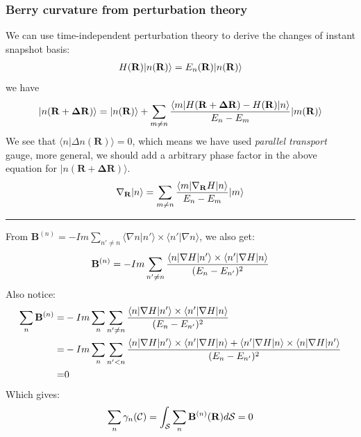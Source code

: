 \documentclass[letterpaper,10pt,english]{sphinxmanual}
\begin{document}
\subsubsection{Berry curvature from perturbation theory}
\label{TI/Lecture notes/2:berry-curvature-from-perturbation-theory}
We can use time-independent perturbation theory to derive the changes of
instant snapshot basis:
\begin{gather}
\begin{split}H(\mathbf{R})|n(\mathbf{R})\rangle=E_n(\mathbf{R})|n(\mathbf{R})\rangle\end{split}\notag
\end{gather}
we have
\begin{gather}
\begin{split}|n(\mathbf{R+\Delta R})\rangle=|n(\mathbf{R})\rangle+\sum_{m\neq n}\frac{\langle m|H(\mathbf{R+\Delta R})-H(\mathbf{R})|n\rangle}{E_n-E_m}|m(\mathbf{R})\rangle\end{split}\notag
\end{gather}
We see that \(\langle n|\Delta n(\mathbf{R})\rangle=0\), which means we
have used \emph{parallel transport} gauge, more general, we should add a
arbitrary phase factor in the above equation for
\(|n(\mathbf{R+\Delta R})\rangle\).
\begin{gather}
\begin{split}\nabla_{\mathbf{R}}|n\rangle=\sum_{m\neq n}\frac{\langle m|\nabla_{\mathbf{R}}H|n\rangle}{E_n-E_m}|m\rangle\end{split}\notag
\end{gather}

\bigskip\hrule{}\bigskip


From
\(\mathbf{B}^{(n)}=-Im\sum\limits_{n'\neq n}\langle\nabla n|n'\rangle\times\langle n'|\nabla n\rangle\),
we also get:
\begin{gather}
\begin{split}\mathbf{B}^{(n)}=-Im\sum_{n'\neq n}\frac{\langle n|\nabla H|n'\rangle\times\langle n'|\nabla H|n\rangle}{(E_n-E_{n'})^2}\end{split}\notag
\end{gather}
Also notice:
\begin{gather}
\begin{split}\sum_n\mathbf{B}^{(n)}=&-Im\sum_n\sum_{n'\neq n}\frac{\langle n|\nabla H|n'\rangle\times\langle n'|\nabla H|n\rangle}{(E_n-E_{n'})^2}\\
=&-Im\sum_n\sum_{n'< n}\frac{\langle n|\nabla H|n'\rangle\times\langle n'|\nabla H|n\rangle+\langle n'|\nabla H|n\rangle\times\langle n|\nabla H|n'\rangle}{(E_n-E_{n'})^2}\\
=&0\end{split}\notag
\end{gather}
Which gives:
\begin{gather}
\begin{split}\sum_n\gamma_n(\mathcal{C})=\int_{\mathcal{S}}\sum_n\mathbf{B}^{(n)}(\mathbf{R})d\mathcal{S}=0\end{split}\notag
\end{gather}
\end{document}
